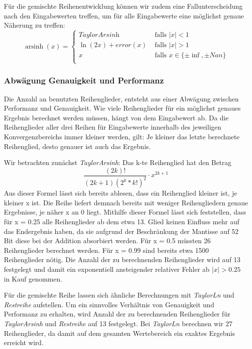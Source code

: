 \documentclass[course=erap] {aspdoc}
\begin{document}
    Für die gemischte Reihenentwicklung können wir zudem eine Fallunterscheidung nach den Eingabewerten treffen, um für alle Eingabewerte eine möglichst genaue Näherung zu treffen:
    \[ \operatorname{arsinh}(x) =
    \begin{cases}
        \textit{TaylorArsinh}     & \text{ falls } |x| < 1 \\
        \ln(2x) + error(x)  & \text{ falls } |x| >1 \\
        x     & \text{ falls } x \in \{\pm\inf, \pm Nan\}\\
    \end{cases}\]

    \subsubsection{Abwägung Genauigkeit und Performanz}
    Die Anzahl an benutzten Reihenglieder, entsteht aus einer Abwägung zwischen Performanz und Genauigkeit.
    Wie viele Reihenglieder für ein möglichst genaues Ergebnis berechnet werden müssen, hängt von dem Eingabewert ab.
    Da die Reihenglieder aller drei Reihen für Eingabewerte innerhalb des jeweiligen Konvergenzbereichs immer kleiner werden, gilt: Je kleiner das letzte berechnete Reihenglied, desto genauer ist auch das Ergebnis.

    Wir betrachten zunächst \textit{TaylorArsinh}:
    Das k-te Reihenglied hat den Betrag
    \[
        \frac{(2k)!}{(2k + 1)(2^k*k!)^2}\cdot x^{2k+1}
    \]
    Aus dieser Formel lässt sich bereits ablesen, dass ein Reihenglied kleiner ist, je kleiner x ist.
    Die Reihe liefert demnach bereits mit weniger Reihengliedern genaue Ergebnisse, je näher x an 0 liegt.
    Mithilfe dieser Formel lässt sich feststellen, dass für x = 0.25 alle Reihenglieder ab dem etwa 13. Glied keinen Einfluss mehr auf das Endergebnis haben, da sie aufgrund der Beschränkung der Mantisse auf 52 Bit diese bei der Addition absorbiert werden.
    Für x = 0.5 müssten 26 Reihenglieder berechnet werden.
    Für x = 0.99 sind bereits etwa 1500 Reihenglieder nötig.
    Die Anzahl der zu berechnenden Reihenglieder wird auf 13 festgelegt und damit ein exponentiell ansteigender relativer Fehler ab $|x|>0.25$ in Kauf genommen.
    
    Für die gemischte Reihe lassen sich ähnliche Berechnungen mit \textit{TaylorLn} und \textit{Restreihe} aufstellen. Um ein sinnvolles Verhältnis von Genauigkeit und Performanz zu erhalten, wird Anzahl der zu berechnenden Reihenglieder für \textit{TaylorArsinh} und \textit{Restreihe} auf 13 festgelegt. Bei \textit{TaylorLn} berechnen wir 27 Reihenglieder, da damit auf dem gesamten Wertebereich ein exaktes Ergebnis erreicht wird.
\end{document}
